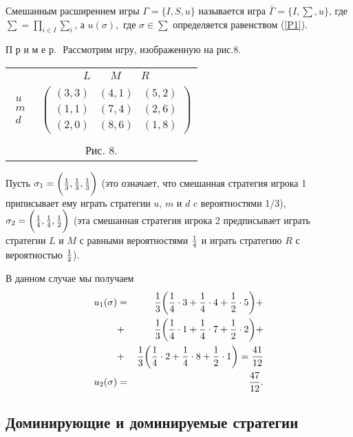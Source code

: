 \begin{definition}
Смешанным расширением игры $\Gamma=\{I,S,u\}$ называется игра
$\bar\Gamma=\{I,\sum,u\}$,  где $\sum=\prod_{i\in I}\sum_i$, а
$u(\sigma),$ где $\sigma\in\sum$ определяется равенством
(\ref{P1}).
\end{definition}

П р и м е р.\,\,  Рассмотрим игру, изображенную на рис.8.

\begin{center}
\begin{tabular}{cc}
&$\begin{array}{ccc} L\quad &M& \quad R \end{array}$\\
$\begin{array}{c} u\\m\\d \end{array}$& $\left(
\begin{array}{ccc}
(3,3)&(4,1)&(5,2)\\
(1,1)&(7,4)&(2,6)\\
(2,0)&(8,6)&(1,8)\end{array}\right)$\\
\multicolumn{2}{c}{}\\
\multicolumn{2}{c}{Рис. 8.}\\
\end{tabular}
\end{center}

Пусть $\sigma_1=\biggl({1\over  3},{1\over 3},{1\over 3}\biggr)$
(это означает, что смешанная стратегия игрока 1 приписывает ему
играть стратегии $u$, $m$  и $d$  c вероятностями  1/3),
$\sigma_2=\biggl({1\over  4}, {1\over  4},{1\over 2}\biggr)$ (эта смешанная
стратегия игрока 2 предписывает играть стратегии $L$ и $M$ с равными
вероятностями ${1\over  4}$ и играть стратегию $R$ с вероятностью ${1\over 2}$).

В данном случае мы получаем
\begin{eqnarray}\nonumber
u_1(\sigma)&=&{1\over 3}\biggl({1\over  4}\cdot 3+{1\over 4}\cdot 4+ {1\over
2}\cdot 5\biggr)+\cr &+&{1\over 3}\biggl({1\over  4}\cdot 1+{1\over 4}\cdot 7+
{1\over 2}\cdot 2\biggr)+\cr &+&{1\over 3}\biggl({1\over  4}\cdot 2+{1\over
4}\cdot 8+ {1\over 2}\cdot 1\biggr)={41\over 12}\cr
u_2(\sigma)&=&{47\over 12}.
\end{eqnarray}

\subsection{Доминирующие и доминируемые стратегии}

